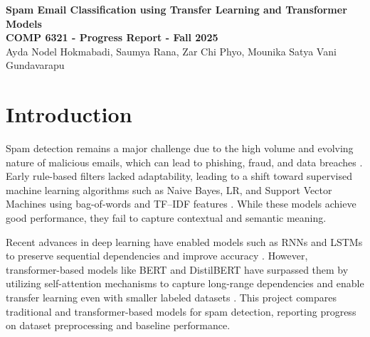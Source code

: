 \documentclass[12pt]{article}
\begin{document}
\begin{center}
{\Large \textbf{Spam Email Classification using Transfer Learning and Transformer Models}}\\[8pt]
{\small \textbf{COMP 6321 - Progress Report - Fall 2025}}\\[5pt]
{\small Ayda Nodel Hokmabadi, Saumya Rana, Zar Chi Phyo, Mounika Satya Vani Gundavarapu}\\[3pt]
\end{center}

\vspace*{-2em}
\normalfont\normalsize
\begin{abstract}
This project aims to implement an effective spam email classification by leveraging both traditional and modern natural language processing (NLP) techniques. As baselines, we designed and evaluated Naive Bayes and Logistic Regression (LR) models using TF--IDF features, achieving strong classification accuracy. Building upon these results, we are currently developing a transformer-based approach using pretrained BERT and DistilBERT models to capture deeper semantic representations of text. The dataset has been preprocessed and tokenized for fine-tuning, and the final implementation of the proposed model is in progress.
\end{abstract}

\section{Introduction}
Spam detection remains a major challenge due to the high volume and evolving nature of malicious emails, which can lead to phishing, fraud, and data breaches \cite{banday2009effectiveness,wang2025review}. Early rule-based filters lacked adaptability, leading to a shift toward supervised machine learning algorithms such as Naive Bayes, LR, and Support Vector Machines using bag-of-words and TF--IDF features \cite{hassan2022analytics,chavez2020nb}. While these models achieve good performance, they fail to capture contextual and semantic meaning.

Recent advances in deep learning have enabled models such as RNNs and LSTMs to preserve sequential dependencies and improve accuracy \cite{johnafrica2022lstm,nasreen2024novel}. However, transformer-based models like BERT and DistilBERT have surpassed them by utilizing self-attention mechanisms to capture long-range dependencies and enable transfer learning even with smaller labeled datasets \cite{tida2022universal,songailaite2023bertphish,asliyuksek2025multimodal}. This project compares traditional and transformer-based models for spam detection, reporting progress on dataset preprocessing and baseline performance.
\end{document}
